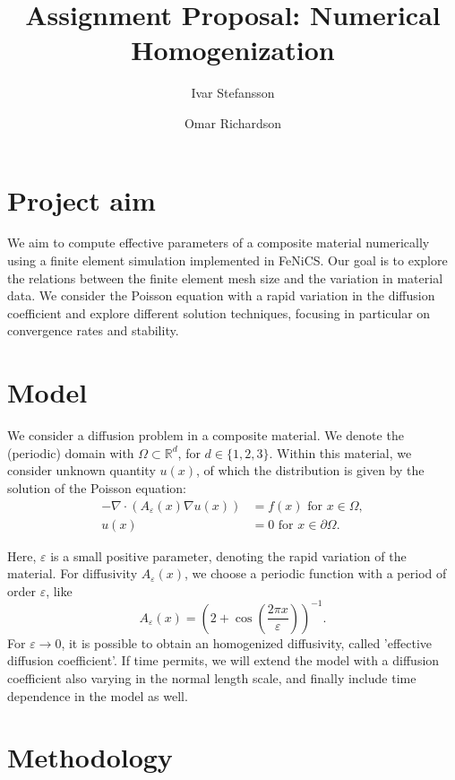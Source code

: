 \documentclass{article}
\title{Assignment Proposal: Numerical Homogenization}\author[1]{Ivar Stefansson}
\author[2]{Omar Richardson}
\affil[1]{Department of Mathematics and Computer Science, Karlstad University}
\affil[2]{Department of Mathematics, University of Bergen}
\renewcommand{\epsilon}{\varepsilon}
\newcommand{\R}{\mathbb{ R}}
\begin{document}
\maketitle

\section{Project aim}
\label{sec:project_aim}

We aim to compute effective parameters of a composite material numerically using a finite element simulation implemented in FeNiCS.
Our goal is to explore the relations between the finite element mesh size and the variation in material data.
We consider the Poisson equation with a rapid variation in the diffusion coefficient and explore different solution techniques, focusing in particular on convergence rates and stability.

\section{Model}
\label{sec:model}
We consider a diffusion problem in a composite material. We denote the (periodic) domain with $\Omega \subset \R^d$, for $d\in\{1,2,3\}$. Within this material, we consider unknown quantity $u(x)$, of which the distribution is given by the solution of the Poisson equation:
\begin{equation}
    \begin{split}
        -\nabla \cdot (A_\epsilon(x)\nabla u(x)) &= f(x) \mbox{ for } x \in \Omega,\\
        u(x) &= 0 \mbox{ for } x \in \partial\Omega.
    \end{split}
    \label{eq:model}
\end{equation}

Here, $\epsilon$ is a small positive parameter, denoting the rapid variation of the material.
For diffusivity $A_\epsilon(x)$, we choose a periodic function with a period of order $\epsilon$, like
$$ A_\epsilon(x) = \left( 2+\cos(\frac{2\pi x}{\epsilon}) \right)^{-1}.$$
For $\epsilon \to 0$, it is possible to obtain an homogenized diffusivity, called 'effective diffusion coefficient'.
If time permits, we will extend the model with a diffusion coefficient also varying in the normal length scale, and finally include time dependence in the model as well.

\section{Methodology}
\label{sec:methodology}
\end{document}
